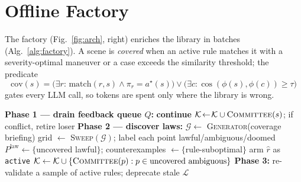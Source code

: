 \documentclass[conference]{IEEEtran}
\begin{document}
\section{Offline Factory}

The factory (Fig.~\ref{fig:arch}, right) enriches the library in batches
(Alg.~\ref{alg:factory}). A scene is \emph{covered} when an active rule matches
it with a severity-optimal maneuver or a case exceeds the similarity
threshold; the predicate
\begin{equation}
\mathrm{cov}(s)\!=\!\big(\exists r{:}\,\mathrm{match}(r,s)\wedge \pi_r\!=\!a^\star(s)\big)\vee\big(\exists c{:}\cos(\phi(s),\phi(c))\!\ge\!\tau\big)
\end{equation}
gates every LLM call, so tokens are spent only where the library is wrong.

\begin{algorithm}[t]
\caption{Factory batch $\mathcal{F}(\mathcal{L},Q)$ (LLM offline)}
\label{alg:factory}
\begin{algorithmic}[1]
\STATE \textbf{Phase 1 — drain feedback queue $Q$:}
    \STATE \textbf{continue} 
  \ENDIF
  \STATE $\mathcal{K}\!\leftarrow\!\mathcal{K}\cup\textsc{Committee}(s)$; if conflict, retire loser
\ENDFOR
\STATE \textbf{Phase 2 — discover laws:}
  \STATE $\mathcal{G}\leftarrow$ \textsc{Generator}(coverage briefing)
  \STATE grid $\leftarrow$ \textsc{Sweep}$(\mathcal{G})$; label each point lawful/ambiguous/doomed
  \STATE $P^{\mathrm{law}}\!\leftarrow\{$uncovered lawful$\}$; counterexamples $\leftarrow\{$rule-suboptimal$\}$
      \STATE arm $\hat r$ as \texttt{active}
    \ENDIF
  \ENDFOR
  \STATE $\mathcal{K}\leftarrow\mathcal{K}\cup\{\textsc{Committee}(p):p\in\text{uncovered ambiguous}\}$
\ENDFOR
\STATE \textbf{Phase 3:} re-validate a sample of active rules; deprecate stale
\RETURN $\mathcal{L}$
\end{algorithmic}
\end{algorithm}
\end{document}
